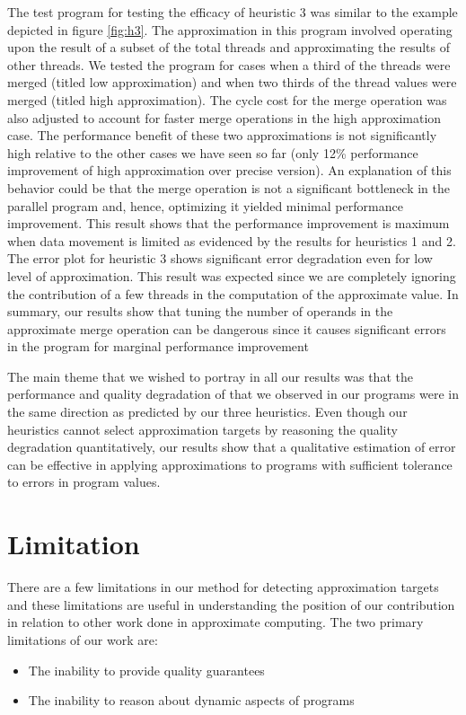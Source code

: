 \documentclass[12pt,conference]{IEEEtran}
\begin{document}
The test program for testing the efficacy of heuristic 3 was similar to the example depicted
in figure \ref{fig:h3}. The approximation in this program involved operating upon the
result of a subset of the total threads and approximating the results of other threads. We 
tested the program for cases when a third of the threads were merged (titled low approximation)
and when two thirds of the thread values were merged (titled high approximation). The cycle
cost for the merge operation was also adjusted to account for faster merge operations in
the high approximation case. The performance benefit of these two approximations is not 
significantly high relative to the other cases we have seen so far (only 
12\% performance improvement of high approximation over precise version). An explanation 
of this behavior could be that the merge operation is not a significant bottleneck in 
the parallel program and, hence, optimizing it yielded minimal performance improvement. 
This result shows that the performance improvement is maximum when data movement is 
limited as evidenced by the results for heuristics 1 and 2. The error plot for heuristic 3 
shows significant error degradation even for low level of approximation. This result
was expected since we are completely ignoring the contribution of a few threads in the 
computation of the approximate value. In summary, our results show that tuning the 
number of operands in the approximate merge operation can be dangerous since it causes
significant errors in the program for marginal performance improvement

The main theme that we wished to portray in all our results was that the 
performance and quality degradation of that we observed in our programs were in
the same direction as predicted by our three heuristics. Even though our heuristics cannot
select approximation targets by reasoning the quality degradation quantitatively, our 
results show that a qualitative estimation of error can be effective in applying 
approximations to programs with sufficient tolerance to errors in program values. 

 
\section{Limitation}

There are a few limitations in our method for detecting approximation targets and these
limitations are useful in understanding the position of our contribution in 
relation to other work done in approximate computing. The two primary limitations 
of our work are:
\begin{itemize}
\item The inability to provide quality guarantees
\item The inability to reason about dynamic aspects of programs
\end{itemize}
\end{document}
